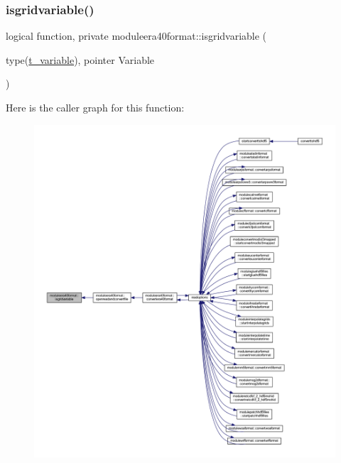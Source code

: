 \mbox{\label{namespacemoduleera40format_a5d0edb2c39da4714b1bffb8a6c97b1a2}} 
\subsubsection{\texorpdfstring{isgridvariable()}{isgridvariable()}}
{\footnotesize\ttfamily logical function, private moduleera40format\+::isgridvariable (\begin{DoxyParamCaption}\item[{type(\mbox{\hyperlink{structmoduleera40format_1_1t__variable}{t\+\_\+variable}}), pointer}]{Variable }\end{DoxyParamCaption})\hspace{0.3cm}{\ttfamily [private]}}

Here is the caller graph for this function\+:\nopagebreak
\begin{figure}[H]
\begin{center}
\leavevmode
\includegraphics[width=350pt]{namespacemoduleera40format_a5d0edb2c39da4714b1bffb8a6c97b1a2_icgraph}
\end{center}
\end{figure}
\mbox{\label{namespacemoduleera40format_aa8632d63af3434480b59776e3b58b294}} 
